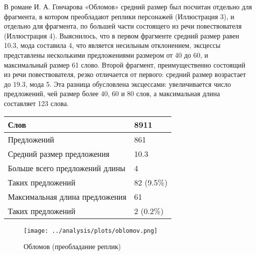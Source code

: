 \documentclass{kursa4}
\begin{document}
{        В романе И. А. Гончарова «Обломов» средний размер
        был посчитан отдельно для фрагмента, в котором преобладают реплики
        персонажей (Иллюстрация 3), и отдельно для фрагмента, по большей части
        состоящего из речи повествователя (Иллюстрация 4). Выяснилось, что в
        первом фрагменте средний размер равен 10.3, мода составила 4, что
        является несильным отклонением, эксцессы представлены несколькими
        предложениями размером от 40 до 60, и максимальный размер 61 слово.
        Второй фрагмент, преимущественно состоящий из речи повествователя,
        резко отличается от первого: средний размер возрастает до 19.3, мода 5.
        Эта разница обусловлена эксцессами: увеличивается
        число предложений, чей размер более 40, 60 и 80 слов, а максимальная
        длина составляет 123 слова. 

        \begin{center}
          \tablehead{}
          \begin{tabular}{|m{5.7730002cm}|m{1.6559999cm}|}
            \hline
            Слов &
            8911\\\hline
            Предложений &
            861\\\hline
            Средний размер предложения &
            10.3\\\hline
            Больше всего предложений длины &
            4\\\hline
            Таких предложений &
            82 (9.5\%)\\\hline
            Максимальная длина предложения &
            61\\\hline
            Таких предложений &
            2 (0.2\%)\\\hline
          \end{tabular}
        \end{center}
        
        \begin{figure}[htbp]
          \centering
          \texttt{[image: ../analysis/plots/oblomov.png]}
          \caption{Обломов (преобладание реплик)}
        \end{figure}


}
\end{document}
